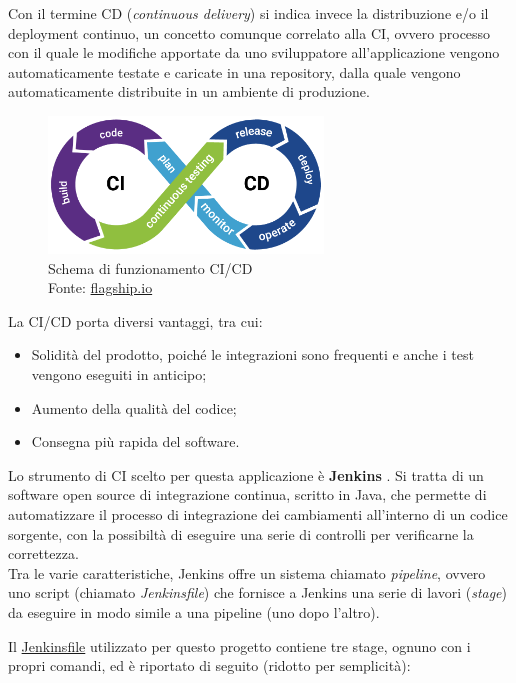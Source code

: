 Con il termine CD (\textit{continuous delivery}) si indica invece la distribuzione e/o il deployment continuo, un concetto comunque correlato alla CI, ovvero processo con il quale le modifiche apportate da uno sviluppatore all'applicazione vengono automaticamente testate e caricate in una repository, dalla quale vengono automaticamente distribuite in un ambiente di produzione. \cite{cicd}

\begin{figure}[H]
\centering
\includegraphics[width=0.65\textwidth,height=\textheight,keepaspectratio]{img/ci}
\caption{Schema di funzionamento CI/CD\\Fonte: \url{flagship.io}}
\label{fig:cicd}
\end{figure}

La CI/CD porta diversi vantaggi, tra cui:
\begin{itemize}
  \item Solidità del prodotto, poiché le integrazioni sono frequenti e anche i test vengono eseguiti in anticipo;
  \item Aumento della qualità del codice;
  \item Consegna più rapida del software.
\end{itemize}

Lo strumento di CI scelto per questa applicazione è \textbf{Jenkins} \cite{jenkins}. Si tratta di un software open source di integrazione continua, scritto in Java, che permette di automatizzare il processo di integrazione dei cambiamenti all'interno di un codice sorgente, con la possibiltà di eseguire una serie di controlli per verificarne la correttezza.\\

Tra le varie caratteristiche, Jenkins offre un sistema chiamato \textit{pipeline}, ovvero uno script (chiamato \textit{Jenkinsfile}) che fornisce a Jenkins una serie di lavori (\textit{stage}) da eseguire in modo simile a una pipeline (uno dopo l'altro).

Il \url{Jenkinsfile} utilizzato per questo progetto contiene tre stage, ognuno con i propri comandi, ed è riportato di seguito (ridotto per semplicità):

